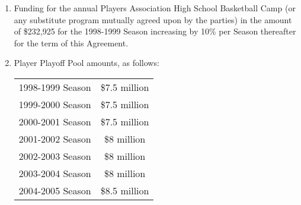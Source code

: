 \documentclass[
]{book}
\begin{document}
\begin{enumerate}
\item
  Funding for the annual Players Association High School Basketball Camp (or any substitute program mutually agreed upon by the parties) in the amount of \$232,925 for the 1998-1999 Season increasing by 10\% per Season thereafter for the term of this Agreement.
\item
  Player Playoff Pool amounts, as follows:

  \begin{longtable}[]{@{}lc@{}}
  \toprule()
  \endhead
  1998-1999 Season & \$7.5 million \\
  1999-2000 Season & \$7.5 million \\
  2000-2001 Season & \$7.5 million \\
  2001-2002 Season & \$8 million \\
  2002-2003 Season & \$8 million \\
  2003-2004 Season & \$8 million \\
  2004-2005 Season & \$8.5 million \\
  \bottomrule()
  \end{longtable}


\end{enumerate}
\end{document}
